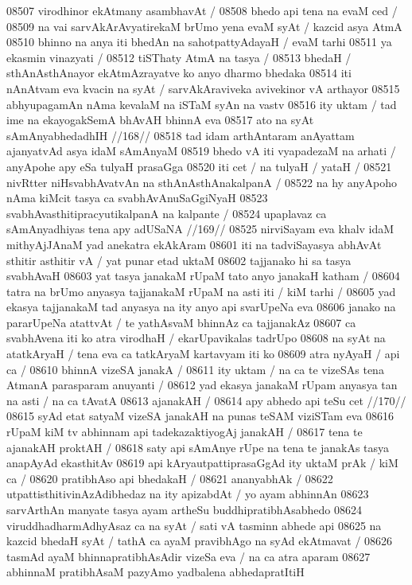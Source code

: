 08507 virodhinor ekAtmany asambhavAt / 
08508 	bhedo api tena na evaM ced / 
08509 na vai sarvAkArAvyatirekaM brUmo yena evaM syAt / kazcid asya AtmA
08510 bhinno na anya iti bhedAn na sahotpattyAdayaH / evaM tarhi 
08511 	ya ekasmin vinazyati /  
08512 	tiSThaty AtmA na tasya /
08513 bhedaH / sthAnAsthAnayor ekAtmAzrayatve ko anyo dharmo bhedaka 
08514 iti nAnAtvam eva kvacin na syAt / sarvAkAraviveka avivekinor vA arthayor
08515 abhyupagamAn nAma kevalaM na iSTaM syAn na vastv  
08516 ity uktam / tad ime na ekayogakSemA bhAvAH bhinnA eva  
08517 	ato na syAt sAmAnyabhedadhIH //168//
08518 tad idam arthAntaram anAyattam ajanyatvAd asya idaM sAmAnyaM  
08519 bhedo vA iti vyapadezaM na arhati / anyApohe apy eSa tulyaH prasaGga 
08520 iti cet / na tulyaH / yataH /
08521 	nivRtter niHsvabhAvatvAn na sthAnAsthAnakalpanA /
08522 na hy anyApoho nAma kiMcit tasya ca svabhAvAnuSaGgiNyaH  
08523 svabhAvasthitipracyutikalpanA na kalpante /  
08524 	upaplavaz ca sAmAnyadhiyas tena apy adUSaNA //169// 
08525 nirviSayam eva khalv idaM mithyAjJAnaM yad anekatra ekAkAram 
08601 iti na tadviSayasya abhAvAt sthitir asthitir vA / yat punar etad uktaM
08602 tajjanako hi sa tasya svabhAvaH  
08603 	yat tasya janakaM rUpaM tato anyo janakaH katham /
08604 tatra na brUmo anyasya tajjanakaM rUpaM na asti iti / kiM tarhi /
08605 yad ekasya tajjanakaM tad anyasya na ity anyo api svarUpeNa eva
08606 janako na pararUpeNa atattvAt / te yathAsvaM bhinnAz ca tajjanakAz  
08607 ca svabhAvena iti ko atra virodhaH / ekarUpavikalas tadrUpo
08608 na syAt na atatkAryaH / tena eva ca tatkAryaM kartavyam iti ko 
08609 atra nyAyaH / api ca /
08610 	bhinnA vizeSA janakA / 
08611 ity uktam / na ca te vizeSAs tena AtmanA parasparam anuyanti /
08612 yad ekasya janakaM rUpam anyasya tan na asti / na ca tAvatA
08613 ajanakAH /
08614 	apy abhedo api teSu cet //170//  
08615 syAd etat satyaM vizeSA janakAH na punas teSAM viziSTam eva  
08616 rUpaM kiM tv abhinnam api tadekazaktiyogAj janakAH / 
08617 	tena te ajanakAH proktAH / 
08618 saty api sAmAnye rUpe na tena te janakAs tasya anapAyAd  ekasthitAv
08619 api kAryautpattiprasaGgAd ity uktaM prAk / kiM ca /
08620 	pratibhAso api bhedakaH / 
08621 	ananyabhAk /
08622 utpattisthitivinAzAdibhedaz na ity apizabdAt / yo ayam abhinnAn 
08623 sarvArthAn manyate tasya ayam artheSu buddhipratibhAsabhedo
08624 viruddhadharmAdhyAsaz ca na syAt / sati vA tasminn abhede api 
08625 na kazcid bhedaH syAt / tathA ca ayaM pravibhAgo na syAd ekAtmavat /
08626 tasmAd ayaM bhinnapratibhAsAdir vizeSa eva / na ca atra aparam
08627 abhinnaM pratibhAsaM pazyAmo yadbalena abhedapratItiH 
